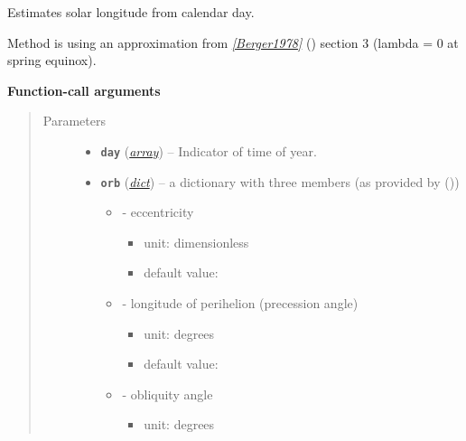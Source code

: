 \documentclass[a4paper,10pt,english]{sphinxmanual}
\begin{document}
\begin{fulllineitems}
\label{api/climlab.solar:climlab.solar.insolation.solar_longitude}
Estimates solar longitude from calendar day.

Method is using an approximation from \label{api/climlab.solar:id3}{\hyperref[references:berger1978]{\emph{{[}Berger1978{]}}}} () section 3
(lambda = 0 at spring equinox).

\textbf{Function-call arguments}
\begin{quote}\begin{description}
\item[{Parameters}] \leavevmode\begin{itemize}
\item {} 
\textbf{\texttt{day}} (\href{http://docs.python.org/2.7/library/array.html\#module-array}{\emph{array}}) -- Indicator of time of year.

\item {} 
\textbf{\texttt{orb}} (\href{http://docs.python.org/2.7/library/stdtypes.html\#dict}{\emph{dict}}) -- 
a dictionary with three members (as provided by 
{\hyperref[api/climlab.solar:climlab.solar.orbital.OrbitalTable]{\emph{}}} ())
\begin{itemize}
\item {} 
 - eccentricity
\begin{itemize}
\item {} 
unit: dimensionless

\item {} 
default value: 

\end{itemize}

\item {} 
 - longitude of perihelion 
(precession angle)
\begin{itemize}
\item {} 
unit: degrees

\item {} 
default value: 

\end{itemize}

\item {} 
 - obliquity angle
\begin{itemize}
\item {} 
unit: degrees


\end{itemize}
\end{itemize}
\end{itemize}
\end{description}
\end{quote}
\end{fulllineitems}
\end{document}
